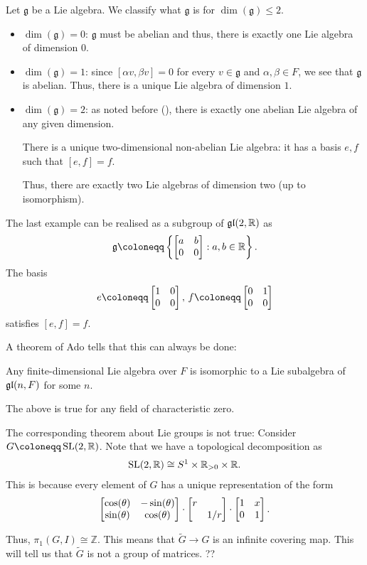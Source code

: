 \documentclass[12pt]{article}
\begin{document}
\begin{ex}
	Let $\mathfrak{g}$ be a Lie algebra. We classify what $\mathfrak{g}$ is for $\dim(\mathfrak{g}) \le 2$.
	\begin{itemize}
		\item $\dim(\mathfrak{g}) = 0$: $\mathfrak{g}$ must be abelian and thus, there is exactly one Lie algebra of dimension $0$.
		\item $\dim(\mathfrak{g}) = 1$: since $[\alpha v, \beta v] = 0$ for every $v \in \mathfrak{g}$ and $\alpha, \beta \in F$, we see that $\mathfrak{g}$ is abelian. Thus, there is a unique Lie algebra of dimension $1$.
		\item $\dim(\mathfrak{g}) = 2$: as noted before (), there is exactly one abelian Lie algebra of any given dimension. 

		There is a unique two-dimensional non-abelian Lie algebra: it has a basis $e, f$ such that $[e, f] = f$.

		Thus, there are exactly two Lie algebras of dimension two (up to isomorphism).
	\end{itemize}
\end{ex}

\begin{ex}
	The last example can be realised as a subgroup of $\mathfrak{gl}(2, \mathbb{R})$ as
	\begin{equation*} 
		\mathfrak{g} \coloneqq \left\{\two{a}{b}{0}{0} : a, b \in \mathbb{R}\right\}.
	\end{equation*}
	The basis 
	\begin{equation*} 
		e \coloneqq \two{1}{0}{0}{0},\, f \coloneqq \two{0}{1}{0}{0}
	\end{equation*}
	satisfies $[e, f] = f$.
\end{ex}

A theorem of Ado tells that this can always be done:
\begin{thm}[Ado]
	Any finite-dimensional Lie algebra over $F$ is isomorphic to a Lie subalgebra of $\mathfrak{gl}(n, F)$ for some $n$.
\end{thm}
The above is true for any field of characteristic zero.

\begin{rem}
	The corresponding theorem about Lie groups is not true: Consider $G \coloneqq \SL(2, \mathbb{R})$. 
	Note that we have a topological decomposition as
	\begin{align*} 
		\operatorname{SL}(2, \mathbb{R}) \cong S^{1} \times \mathbb{R}_{> 0} \times \mathbb{R}.
	\end{align*}
	This is because every element of $G$ has a unique representation of the form
	\begin{equation*} 
		\begin{bmatrix} \cos(\theta) & -\sin(\theta) \\ \sin(\theta) & \cos(\theta) \end{bmatrix} \cdot \begin{bmatrix} r &  \\  & 1/r \end{bmatrix} \cdot \begin{bmatrix} 1 & x \\ 0 & 1 \end{bmatrix}.
	\end{equation*}

	Thus, $\pi_{1}(G, I) \cong \mathbb{Z}$. 
	This means that $\widetilde{G} \to G$ is an infinite covering map. 
	This will tell us that $\widetilde{G}$ is not a group of matrices. ??
\end{rem}
\end{document}
